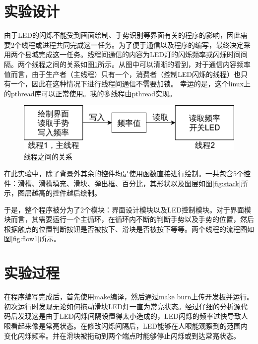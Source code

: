 \documentclass{report}
\begin{document}
\section{实验设计}
\par 由于LED的闪烁不能受到画面绘制、手势识别等界面有关的程序的影响，因此需要2个线程或进程共同完成这一任务。为了便于通信以及程序的编写，最终决定采用两个县城完成这一任务。线程间通信的内容为LED灯的闪烁频率或闪烁时间间隔。两个线程之间的关系如图\ref{fig:threadRelation}所示。从图中可以清晰的看到，对于通信内容频率值而言，由于生产者（主线程）只有一个，消费者（控制LED闪烁的线程）也只有一个，因此在这种情况下进行线程间通信不需要加锁。
幸运的是，这个linux上的pthread库可以正常使用。我的多线程由pthread实现。
\begin{figure}[htpb]
    \centering
    \includegraphics[width=0.6\linewidth]{threadRelation.png}
    \caption{线程之间的关系}
    \label{fig:threadRelation}
\end{figure}

\par 在此实验中，除了背景外其余的控件均是使用函数直接进行绘制。一共包含5个控件：滑槽、滑槽填充、滑块、弹出框、百分比，其形状以及图层如图\ref{fig:stack}所示，图层越高的控件越后绘制。

\par 于是，整个程序被分为了2个模块：界面设计模块以及LED控制模块。对于界面模块而言，其需要运行一个主循环，在循环内不断的判断手势以及手势的位置，然后根据触点的位置判断按钮是否被按下、滑块是否被按下等等。两个线程的流程图如图\ref{fig:flow1}所示。

\section{实验过程}
\label{sec:shi_yan_guo_cheng_}
\par 在程序编写完成后，首先使用make编译，然后通过make burn上传开发板并运行。初次运行时发现无论如何拖动滑块LED灯一直为常亮状态。经过仔细的分析源代码后发现这是由于LED闪烁间隔设置得太小造成的，LED闪烁的频率过快导致人眼看起来像是常亮状态。在修改闪烁间隔后，LED能够在人眼能观察到的范围内变化闪烁频率。并在滑块被拖动到两个端点时能够停止闪烁或到达常亮状态。
\end{document}
